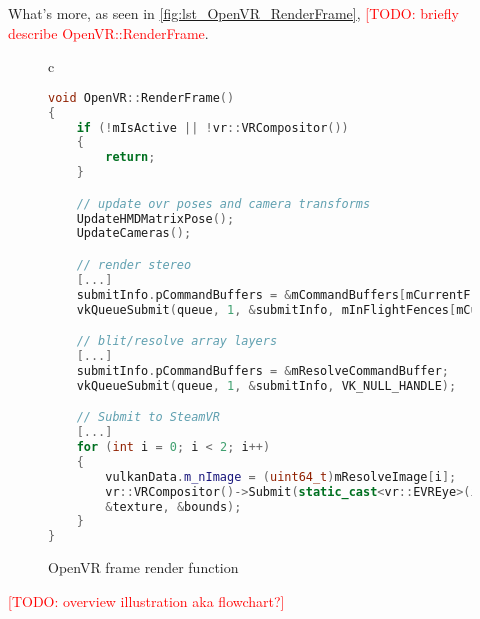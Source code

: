 What's more, as seen in \autoref{fig:lst_OpenVR_RenderFrame}, \textcolor{red}{[TODO: briefly describe OpenVR::RenderFrame}. \\

\begin{figure}[htb]
  \centering
  \begin{tabular}{c}
  \begin{lstlisting}[language=C++]
void OpenVR::RenderFrame()
{
	if (!mIsActive || !vr::VRCompositor())
	{
		return;
	}

	// update ovr poses and camera transforms
	UpdateHMDMatrixPose();
	UpdateCameras();

	// render stereo
	[...]
	submitInfo.pCommandBuffers = &mCommandBuffers[mCurrentFrame];
	vkQueueSubmit(queue, 1, &submitInfo, mInFlightFences[mCurrentFrame]);

	// blit/resolve array layers
	[...]
	submitInfo.pCommandBuffers = &mResolveCommandBuffer;
	vkQueueSubmit(queue, 1, &submitInfo, VK_NULL_HANDLE);

	// Submit to SteamVR
	[...]
	for (int i = 0; i < 2; i++)
	{
		vulkanData.m_nImage = (uint64_t)mResolveImage[i];
		vr::VRCompositor()->Submit(static_cast<vr::EVREye>(i), 
		&texture, &bounds);
	}
}
	\end{lstlisting}
  \end{tabular}
  \caption[OpenVR render target's RenderFrame]{OpenVR frame render function}\label{fig:lst_OpenVR_RenderFrame}
\end{figure}

\textcolor{red}{[TODO: overview illustration aka flowchart?]}